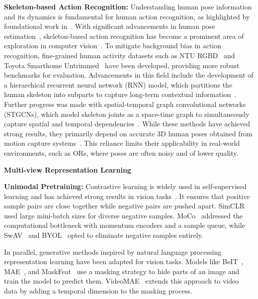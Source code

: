 \noindent \textbf{Skeleton-based Action Recognition: } Understanding human pose information and its dynamics is fundamental for human action recognition, as highlighted by foundational work in~\citep{Johansson1973VisualPO}. With significant advancements in human pose estimation~\citep{cao2017realtime,PCT}, skeleton-based action recognition has become a prominent area of exploration in computer vision~\citep{duan2022revisiting,zhou2023learning}. To mitigate background bias in action recognition, fine-grained human activity datasets such as NTU RGBD~\citep{shahroudy2016ntu} and Toyota Smarthome Untrimmed~\citep{Dai2020ToyotaSU} have been developed, providing more robust benchmarks for evaluation. Advancements in this field include the development of a hierarchical recurrent neural network (RNN) model, which partitions the human skeleton into subparts to capture long-term contextual information~\citep{Du_RNN}. Further progress was made with spatial-temporal graph convolutional networks (STGCNs), which model skeleton joints as a space-time graph to simultaneously capture spatial and temporal dependencies~\citep{kipf2016semi,STGCN}. While these methods have achieved strong results, they primarily depend on accurate 3D human poses obtained from motion capture systems~\citep{MoCAP}. This reliance limits their applicability in real-world environments, such as ORs, where poses are often noisy and of lower quality.

\noindent \textbf{Multi-view Representation Learning}

\noindent \textbf{Unimodal Pretraining:} Contrastive learning is widely used in self-supervised learning and has achieved strong results in vision tasks~\citep{SimCLR,MoCo,Swav,BYOL}. It ensures that positive sample pairs are close together while negative pairs are pushed apart. 
SimCLR~\citep{SimCLR} used large mini-batch sizes for diverse negative samples. MoCo~\citep{MoCo} addressed the computational bottleneck with momentum encoders and a sample queue, while SwAV~\citep{Swav} and BYOL~\citep{BYOL} opted to eliminate negative samples entirely.


In parallel, generative methods inspired by natural language processing representation learning have been adapted for vision tasks. Models like BeIT~\citep{BEiT}, MAE~\citep{MAE}, and MaskFeat~\citep{MaskFeat} use a masking strategy to hide parts of an image and train the model to predict them. VideoMAE~\citep{VMAE} extends this approach to video data by adding a temporal dimension to the masking process. %

